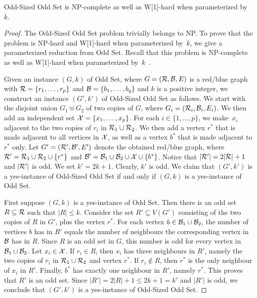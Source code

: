 \documentclass[11pt]{llncs}
\newcommand{\NP}{{\sf NP}}
\newcommand{\W}{{\sf W[1]}}
\begin{document}
\begin{lemma}
\label{l-oddsized}
{\sc Odd-Sized Odd Set} is \NP-complete as well as \W-hard when
parameterized by $k$.
\end{lemma}

\begin{proof}
The {\sc Odd-Sized Odd Set} problem trivially belongs to \NP. To prove
that the problem is \NP-hard and \W-hard when parameterized
by~$k$, we give a parameterized reduction from {\sc Odd Set}. 
Recall that this problem is \NP-complete as well as \W-hard when
parameterized by~$k$~\cite{DowneyFVW99}.

Given an instance $(G,k)$ of {\sc Odd Set}, where $G=({\cal R},{\cal B},E)$ is
a red/blue graph with ${\cal R}=\{r_1,\ldots,r_p\}$ and ${\cal
B}=\{b_1,\ldots,b_q\}$ and $k$ is 
a positive integer, we construct an instance $(G',k')$ of {\sc Odd-Sized Odd
Set} as follows. We start with the disjoint union $G_1\uplus G_2$ of two copies
of $G$, where $G_i=({\cal R}_i,{\cal B}_i,E_i)$. We then add an independent set
${\cal X}=\{x_1,\ldots,x_p\}$. For each $i\in \{1,\ldots,p\}$, we make~$x_i$
adjacent to the two copies of $r_i$ in ${\cal R}_1\cup {\cal R}_2$. We then add
a vertex $r^*$ that is made adjacent to all vertices in ${\cal X}$, as well as
a vertex $b^*$ that is made adjacent to $r^*$ only. Let $G'=({\cal R}',{\cal
B}',E')$ denote the obtained red/blue graph, where ${\cal R}'={\cal R}_1\cup
{\cal R}_2\cup \{r^*\}$ and ${\cal B}'={\cal B}_1\cup {\cal B}_2 \cup {\cal
X}\cup \{b^*\}$. 
Notice that $|{\cal R'}|=2|{\cal R}|+1$ and $|{\cal R'}|$ is odd.  We set
$k'=2k+1$. 
Clearly,  $k'$ is odd.  We claim that $(G',k')$ is a yes-instance of {\sc
Odd-Sized Odd Set} if and only if $(G,k)$ is a yes-instance of {\sc Odd Set}.

First suppose $(G,k)$ is a yes-instance of {\sc Odd Set}. Then there is an odd
set $R\subseteq {\cal R}$ such that $|R|\leq k$. Consider the set $R'\subseteq
V(G')$ consisting of the two copies of $R$ in $G'$, plus the vertex $r^*$. For
each vertex $b\in {\cal B}_1\cup {\cal B}_2$, the number of vertices $b$ has in
$R'$ equals the number of neighbours the corresponding vertex in ${\cal B}$ has
in $R$. Since $R$ is an odd set in $G$, this number is odd for every vertex in
${\cal B}_1\cup {\cal B}_2$. Let $x_i\in {\cal X}$. If $r_i\in R$, then $x_i$
has three neighbours in $R'$, namely the two copies of $r_i$ in ${\cal R}_1\cup
{\cal R}_2$ and vertex $r^*$. If $r_i\notin R$, then $r^*$ is the only
neighbour of $x_i$ in $R'$. Finally, $b^*$ has exactly one neighbour in $R'$,
namely $r^*$. This proves that $R'$ is an odd set. Since $|R'|=2|R|+1\leq
2k+1=k'$ and $|R'|$ is odd, we conclude that $(G',k')$ is a yes-instance of
{\sc Odd-Sized Odd Set}. 


\end{proof}
\end{document}
